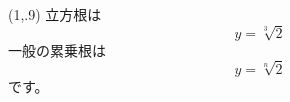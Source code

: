 \begin{shownhcProg}(1,.9)
立方根は
\[
  y = \sqrt[3]{2}
\]
一般の累乗根は
\[
  y = \sqrt[n]{2}
\]
です。
\end{shownhcProg}
